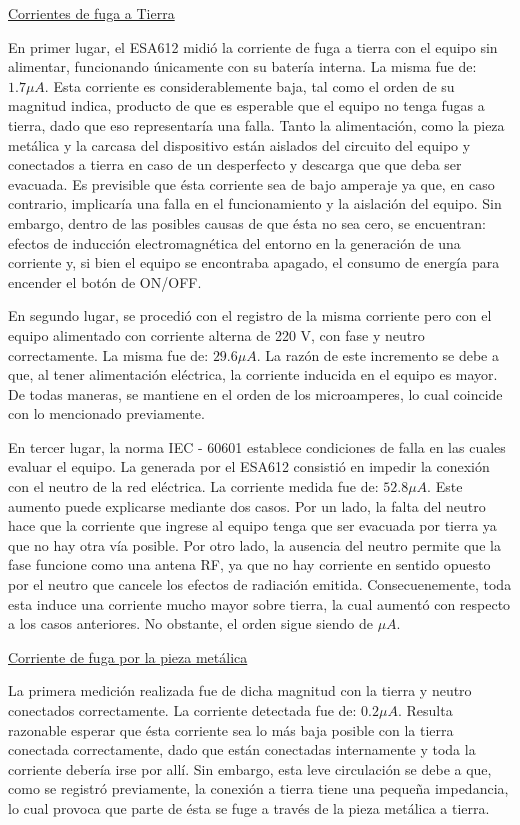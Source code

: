 \underline{Corrientes de fuga a Tierra}

En primer lugar, el ESA612 midió la corriente de fuga a tierra con el equipo sin alimentar, funcionando únicamente con su batería interna. La misma fue de: $1.7 \mu A$. Esta corriente es considerablemente baja, tal como el orden de su magnitud indica, producto de que
    es esperable que el equipo no tenga fugas a tierra, dado que eso representaría una falla. Tanto la alimentación, como la pieza metálica y la carcasa del dispositivo están aislados del circuito del equipo y conectados a tierra en caso de un desperfecto y descarga que
    que deba ser evacuada. Es previsible que ésta corriente sea de bajo amperaje ya que, en caso contrario, implicaría una falla en el funcionamiento y la aislación del equipo. Sin embargo, dentro de las posibles causas de que ésta no sea cero, se encuentran: efectos de inducción
    electromagnética del entorno en la generación de una corriente y, si bien el equipo se encontraba apagado, el consumo de energía para encender el botón de ON/OFF.

En segundo lugar, se procedió con el registro de la misma corriente pero con el equipo alimentado con corriente alterna de 220 V, con fase y neutro correctamente. La misma fue de: $29.6 \mu A$. La razón de este incremento se debe a que, al tener alimentación eléctrica, 
    la corriente inducida en el equipo es mayor. De todas maneras, se mantiene en el orden de los microamperes, lo cual coincide con lo mencionado previamente.

En tercer lugar, la norma IEC - 60601 establece condiciones de falla en las cuales evaluar el equipo. La generada por el ESA612 consistió en impedir la conexión con el neutro de la red eléctrica. La corriente medida fue de: $52.8 \mu A$. Este aumento puede explicarse mediante dos casos. Por un lado,
    la falta del neutro hace que la corriente que ingrese al equipo tenga que ser evacuada por tierra ya que no hay otra vía posible. Por otro lado, la ausencia del neutro permite que la fase funcione como una antena RF, ya que no hay corriente en sentido opuesto por el neutro que cancele los efectos
    de radiación emitida. Consecuenemente, toda esta induce una corriente mucho mayor sobre tierra, la cual aumentó con respecto a los casos anteriores. No obstante, el orden sigue siendo de $\mu A$.

\underline{Corriente de fuga por la pieza metálica}

La primera medición realizada fue de dicha magnitud con la tierra y neutro conectados correctamente. La corriente detectada fue de: $0.2 \mu A$. Resulta razonable esperar que ésta corriente sea lo más baja posible con la tierra conectada correctamente, dado que están conectadas internamente y toda la corriente
    debería irse por allí. Sin embargo, esta leve circulación se debe a que, como se registró previamente, la conexión a tierra tiene una pequeña impedancia, lo cual provoca que parte de ésta se fuge a través de la pieza metálica a tierra.

